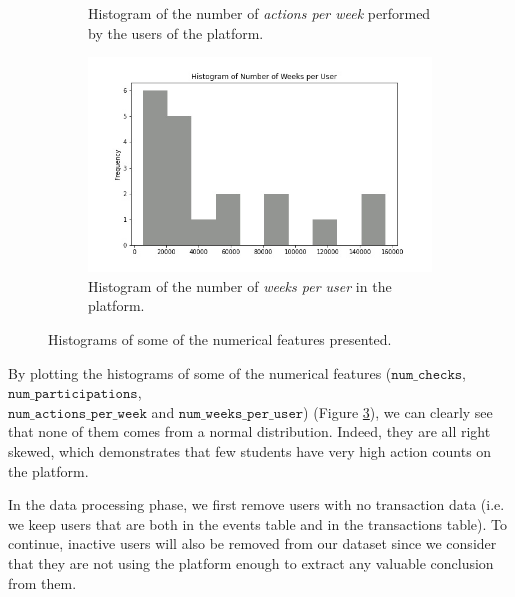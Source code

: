 \documentclass[sigplan,screen]{acmart}
\begin{document}
\begin{figure}
\begin{subfigure}[b]{\linewidth}
         \caption{Histogram of the number of \emph{actions per week} performed by the users of the platform.}
         \label{fig:actions_per_week}
     \end{subfigure}
     \hfill
     \begin{subfigure}[b]{\linewidth}
         \centering
         \includegraphics[width=0.82\linewidth]{reports/figures/histogram_number_of_weeks_per_user.jpg}
         \caption{Histogram of the number of \emph{weeks per user} in the platform.}
         \label{fig:weeks_per_user}
     \end{subfigure}
        \caption{Histograms of some of the numerical features presented.}
        \label{fig:histograms}
\end{figure}

By plotting the histograms of some of the numerical features ($\texttt{num\_checks}$, $\texttt{num\_participations}$, \\ $\texttt{num\_actions\_per\_week}$ and $\texttt{num\_weeks\_per\_user}$) (Figure \ref{fig:histograms}), we can clearly see that none of them comes from a normal distribution. Indeed, they are all right skewed, which demonstrates that few students have very high action counts on the platform.

In the data processing phase, we first remove users with no transaction data (i.e. we keep users that are both in the events table and in the transactions table). To continue, inactive users will also be removed from our dataset since we consider that they are not using the platform enough to extract any valuable conclusion from them.
\end{document}
